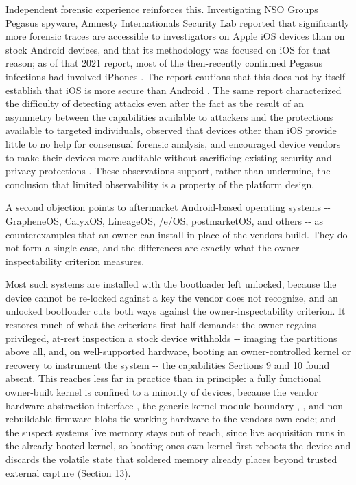 \documentclass[
]{article}
\begin{document}
Independent forensic experience reinforces this. Investigating NSO
Group\textquotesingle s Pegasus spyware, Amnesty
International\textquotesingle s Security Lab reported that significantly
more forensic traces are accessible to investigators on Apple iOS
devices than on stock Android devices, and that its methodology was
focused on iOS for that reason; as of that 2021 report, most of the
then-recently confirmed Pegasus infections had involved iPhones
\citep{amnesty-pegasus-methodology}. The report cautions that this does
not by itself establish that iOS is more secure than Android
\citep{amnesty-pegasus-methodology}. The same report characterized the
difficulty of detecting attacks even after the fact as the result of an
asymmetry between the capabilities available to attackers and the
protections available to targeted individuals, observed that devices
other than iOS provide little to no help for consensual forensic
analysis, and encouraged device vendors to make their devices more
auditable without sacrificing existing security and privacy protections
\citep{amnesty-pegasus-methodology}. These observations support, rather
than undermine, the conclusion that limited observability is a property
of the platform design.

A second objection points to aftermarket Android-based operating systems
-\/- GrapheneOS, CalyxOS, LineageOS, /e/OS, postmarketOS, and others
-\/- as counterexamples that an owner can install in place of the
vendor\textquotesingle s build. They do not form a single case, and the
differences are exactly what the owner-inspectability criterion
measures.

Most such systems are installed with the bootloader left unlocked,
because the device cannot be re-locked against a key the vendor does not
recognize, and an unlocked bootloader cuts both ways against the
owner-inspectability criterion. It restores much of what the
criterion\textquotesingle s first half demands: the owner regains
privileged, at-rest inspection a stock device withholds -\/- imaging the
partitions above all, and, on well-supported hardware, booting an
owner-controlled kernel or recovery to instrument the system -\/- the
capabilities Sections 9 and 10 found absent. This reaches less far in
practice than in principle: a fully functional owner-built kernel is
confined to a minority of devices, because the vendor
hardware-abstraction interface \citep{aosp-hal}, the generic-kernel
module boundary \citep{aosp-gki}, \citep{aosp-loadable-kernel-modules},
and non-rebuildable firmware blobs tie working hardware to the
vendor\textquotesingle s own code; and the suspect
system\textquotesingle s live memory stays out of reach, since live
acquisition runs in the already-booted kernel, so booting
one\textquotesingle s own kernel first reboots the device and discards
the volatile state that soldered memory already places beyond trusted
external capture (Section 13).
\end{document}
